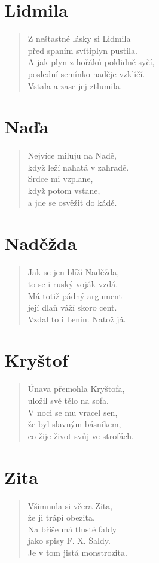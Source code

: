 \section*{Lidmila}
\begin{verse}
Z nešťastné lásky si Lidmila\\
před spaním svítiplyn pustila.\\
A jak plyn z hořáků poklidně syčí,\\
poslední semínko naděje vzklíčí.\\
Vstala a zase jej ztlumila.
\end{verse}

\section*{Naďa}
\begin{verse}
Nejvíce miluju na Nadě,\\
když leží nahatá v zahradě.\\
Srdce mi vzplane,\\
když potom vstane,\\
a jde se osvěžit do kádě.
\end{verse}

\section*{Naděžda}
\begin{verse}
Jak se jen blíží Naděžda,\\
to se i ruský voják vzdá.\\
Má totiž pádný argument --\\
její dlaň váží skoro cent.\\
Vzdal to i Lenin. Natož já.
\end{verse}

\section*{Kryštof}
\begin{verse}
Únava přemohla Kryštofa,\\
uložil své tělo na sofa.\\
V noci se mu vracel sen,\\
že byl slavným básníkem,\\
co žije život svůj ve strofách.
\end{verse}

\section*{Zita}
\begin{verse}
Všimnula si včera Zita,\\
že ji trápí obezita.\\
Na břiše má tlusté faldy\\
jako spisy F. X. Šaldy.\\
Je v tom jistá monstrozita.
\end{verse}

